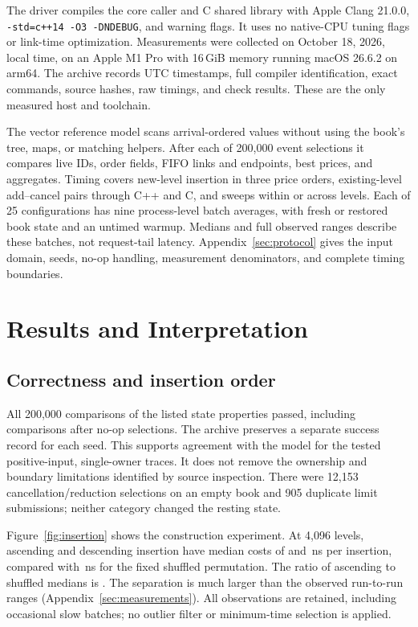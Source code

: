 \documentclass[10pt,letterpaper,twocolumn]{article}
\newcommand{\code}[1]{\texttt{#1}}
\begin{document}
The driver compiles the core caller and C shared library with Apple Clang
21.0.0, \code{-std=c++14 -O3 -DNDEBUG}, and warning flags. It uses no native-CPU
tuning flags or link-time optimization. Measurements were collected on
October 18, 2026, local time, on an Apple M1 Pro with 16\,GiB memory running
macOS 26.6.2 on arm64. The archive records UTC timestamps, full compiler
identification, exact commands, source hashes, raw timings, and check results.
These are the only measured host and toolchain.

The vector reference model scans arrival-ordered values without using the
book's tree, maps, or matching helpers. After each of 200,000 event selections
it compares live IDs, order fields, FIFO links and endpoints, best prices,
and aggregates. Timing covers new-level insertion in three price orders,
existing-level add--cancel pairs through C++ and C, and sweeps within or across
levels. Each of 25 configurations has nine process-level batch averages,
with fresh or restored book state and an untimed warmup. Medians and full
observed ranges describe these batches, not request-tail latency.
Appendix~\ref{sec:protocol} gives the input domain, seeds, no-op handling,
measurement denominators, and complete timing boundaries.

\section{Results and Interpretation}\label{sec:results}
\subsection{Correctness and insertion order}
All 200,000 comparisons of the listed state properties passed, including
comparisons after no-op selections. The archive preserves a separate success
record for each seed. This supports agreement with the model for the tested
positive-input, single-owner traces. It does not
remove the ownership and boundary limitations identified by source inspection.
There were 12,153 cancellation/reduction selections on an empty book and
905 duplicate limit submissions; neither category changed the resting state.

Figure~\ref{fig:insertion} shows the construction experiment. At 4,096 levels,
ascending and descending insertion have median costs of \StudyAscLast{} and
\StudyDescLast{}\,ns per insertion, compared with \StudyShuffleLast{}\,ns for
the fixed shuffled permutation. The ratio of ascending to shuffled medians is
\StudyInsertionRatio{}. The separation is much larger than the observed
run-to-run ranges (Appendix~\ref{sec:measurements}).
All observations are retained, including occasional slow batches; no outlier
filter or minimum-time selection is applied.
\end{document}

